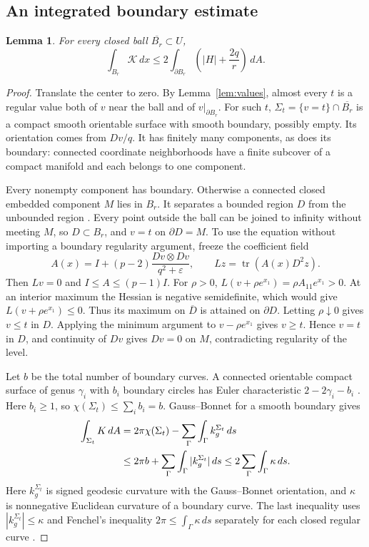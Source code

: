 \documentclass[11pt]{article}
\newtheorem{lemma}[theorem]{Lemma}
\theoremstyle{remark}
\newcommand{\dd}{\,dx}
\newcommand{\dA}{\,dA}
\newcommand{\ds}{\,ds}
\newcommand{\tr}{\operatorname{tr}}
\newcommand{\eps}{\varepsilon}
\begin{document}
\subsection{An integrated boundary estimate}

\begin{lemma}\label{lem:boundary}
For every closed ball $\overline{B_r}\subset U$,
\begin{equation}\label{eq:boundary}
 \int_{B_r}\mathcal K\dd
 \leq2\int_{\partial B_r}\left(|H|+\frac{2q}{r}\right)\dA.
\end{equation}
\end{lemma}

\begin{proof}
Translate the center to zero. By Lemma~\ref{lem:values}, almost
every $t$ is a regular value both of $v$ near the ball and of
$v|_{\partial B_r}$. For such $t$,
$\Sigma_t=\{v=t\}\cap\overline{B_r}$ is a compact smooth
orientable surface with smooth boundary, possibly empty.
Its orientation comes from $Dv/q$.
It has finitely many components, as does its boundary: connected
coordinate neighborhoods have a finite subcover of a compact
manifold and each belongs to one component.

Every nonempty component has boundary. Otherwise a connected
closed embedded component $M$ lies in $B_r$. It separates a bounded
region $D$ from the unbounded region
\cite[B19]{SullivanSurfaces}. Every point outside the ball can
be joined to infinity without meeting $M$, so $D\subset B_r$,
and $v=t$ on $\partial D=M$.
To use the equation without importing a boundary regularity
argument, freeze the coefficient field
\[
 A(x)=I+(p-2)\frac{Dv\otimes Dv}{q^2+\eps},\qquad
 Lz=\tr(A(x)D^2z).
\]
Then $Lv=0$ and $I\leq A\leq(p-1)I$. For $\rho>0$,
$L(v+\rho e^{x_1})=\rho A_{11}e^{x_1}>0$.
At an interior maximum the Hessian is negative semidefinite,
which would give $L(v+\rho e^{x_1})\leq0$.
Thus its maximum on $\overline D$ is attained on $\partial D$.
Letting $\rho\downarrow0$ gives $v\leq t$ in $D$.
Applying the minimum argument to $v-\rho e^{x_1}$ gives
$v\geq t$. Hence $v=t$ in $D$, and continuity of $Dv$ gives
$Dv=0$ on $M$, contradicting regularity of the level.

Let $b$ be the total number of boundary curves. A connected
orientable compact surface of genus $\gamma_i$ with $b_i$
boundary circles has Euler characteristic $2-2\gamma_i-b_i$
\cite[B17]{SullivanSurfaces}. Here $b_i\geq1$, so
$\chi(\Sigma_t)\leq\sum_i b_i=b$.
Gauss--Bonnet for a smooth boundary
\cite[B16--B18]{SullivanSurfaces} gives
\begin{align}
 \int_{\Sigma_t}K\dA
 &=2\pi\chi(\Sigma_t)-\sum_\Gamma\int_\Gamma k_g^{\Sigma_t}\ds
 \notag\\
 &\leq2\pi b+\sum_\Gamma\int_\Gamma|k_g^{\Sigma_t}|\ds
 \leq2\sum_\Gamma\int_\Gamma\kappa\ds. \label{eq:GB}
\end{align}
Here $k_g^{\Sigma_t}$ is signed geodesic curvature with the
Gauss--Bonnet orientation, and $\kappa$ is nonnegative Euclidean
curvature of a boundary curve. The last inequality uses
$|k_g^{\Sigma_t}|\leq\kappa$ and Fenchel's inequality
$2\pi\leq\int_\Gamma\kappa\ds$ separately for each closed
regular curve \cite[Theorem 2.4 and Proposition 3.1]{SullivanCurves}.


\end{proof}
\end{document}
